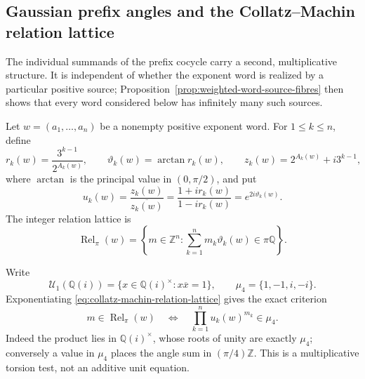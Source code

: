 \subsection{Gaussian prefix angles and the Collatz--Machin relation lattice}
\label{subsec:collatz-machin-relations}

The individual summands of the prefix cocycle carry a second, multiplicative
structure.  It is independent of whether the exponent word is realized by a
particular positive source; Proposition~\ref{prop:weighted-word-source-fibres}
then shows that every word considered below has infinitely many such sources.

\begin{definition}
\label{def:collatz-machin-relation-lattice}
Let $w=(a_1,\ldots,a_n)$ be a nonempty positive exponent word.  For
$1\leq k\leq n$, define
\begin{equation}
\label{eq:collatz-machin-angle-data}
 r_k(w)=\frac{3^{k-1}}{2^{A_k(w)}},\qquad
 \vartheta_k(w)=\arctan r_k(w),\qquad
 z_k(w)=2^{A_k(w)}+i3^{k-1},
\end{equation}
where $\arctan$ is the principal value in $(0,\pi/2)$, and put
\begin{equation}
\label{eq:collatz-machin-unit-product}
 u_k(w)=\frac{z_k(w)}{\overline{z_k(w)}}
       =\frac{1+i r_k(w)}{1-i r_k(w)}
       =e^{2i\vartheta_k(w)}.
\end{equation}
The integer relation lattice is
\begin{equation}
\label{eq:collatz-machin-relation-lattice}
 \operatorname{Rel}_{\pi}(w)=
 \left\{m\in\mathbb Z^n:
 \sum_{k=1}^n m_k\vartheta_k(w)\in\pi\mathbb Q\right\}.
\end{equation}
\end{definition}

Write
\[
 \mathcal U_1(\mathbb Q(i))
 =\{x\in\mathbb Q(i)^\times:x\overline{x}=1\},
 \qquad \mu_4=\{1,-1,i,-i\}.
\]
Exponentiating \eqref{eq:collatz-machin-relation-lattice} gives the exact
criterion
\begin{equation}
\label{eq:collatz-machin-torsion-criterion}
 m\in\operatorname{Rel}_{\pi}(w)
 \quad\Longleftrightarrow\quad
 \prod_{k=1}^n u_k(w)^{m_k}\in\mu_4.
\end{equation}
Indeed the product lies in $\mathbb Q(i)^\times$, whose roots of unity are
exactly $\mu_4$; conversely a value in $\mu_4$ places the angle sum in
$(\pi/4)\mathbb Z$.  This is a multiplicative torsion test, not an additive
unit equation.

